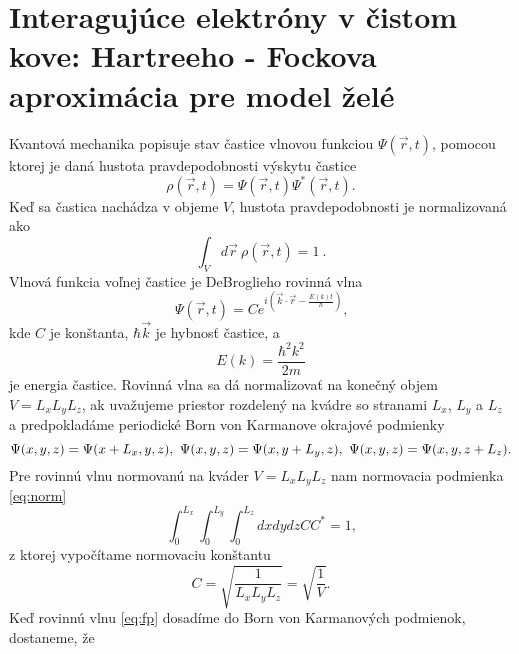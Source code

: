 \section{Interagujúce elektróny v čistom kove: Hartreeho - Fockova aproximácia pre model želé}
\label{sec:free_electrons}

Kvantová mechanika popisuje stav častice vlnovou funkciou $\Psi(\vec r,t)$, pomocou ktorej
je daná hustota pravdepodobnosti výskytu častice
\begin{equation}
\label{eq:fp2}
 \rho(\vec r, t)=\Psi(\vec r, t)\Psi^\ast(\vec r, t)\text{.}
\end{equation}
Keď sa častica nachádza v objeme $V$, hustota pravdepodobnosti je normalizovaná ako
\begin{equation}
\label{eq:norm}
 \int_{V} d \vec r  \  \rho(\vec r,t) = 1 \ .
\end{equation}
Vlnová funkcia voľnej častice je DeBroglieho rovinná vlna
\begin{equation}
\label{eq:fp}
 \Psi(\vec r,t)=Ce^{i(\vec k\cdot\vec r-\frac{E(k)t}{\hbar})} \text{,}
\end{equation}
kde $C$ je konštanta, $\hbar \vec k$ je hybnosť častice, a
\begin{equation}
 \label{eq:fp_erg}
 E(k)=\frac{\hbar^2 k^2}{2 m} \text{}
\end{equation}
je energia častice. Rovinná vlna sa dá normalizovať na konečný objem $V = L_xL_yL_z$,
ak uvažujeme priestor rozdelený na kvádre so stranami $L_x$, $L_y$ a $L_z$ a predpokladáme
periodické Born von Karmanove okrajové podmienky
\begin{equation}
 \Psi(x,y,z)=\Psi(x+L_x,y,z)\\, \\\ \Psi(x,y,z)=\Psi(x,y+L_y,z)\\, \\\ \Psi(x,y,z)=\Psi(x,y,z+L_z) \text{.}
\end{equation}
Pre rovinnú vlnu normovanú na kváder $V = L_xL_yL_z$ nam normovacia podmienka \eqref{eq:norm}
\begin{equation}
\label{eq:norm_bvk}
 \int_{0}^{L_x}  \int_{0}^{L_y}  \int_{0}^{L_z} dx dy dz  CC^\ast = 1\text{,}
\end{equation}
z ktorej vypočítame normovaciu konštantu
\begin{equation}
 \label{eq:A}
 C=\sqrt{\frac{1}{L_xL_yL_z}} = \sqrt{\frac{1}{V}} \text{.}
\end{equation}
Keď rovinnú vlnu \eqref{eq:fp} dosadíme do Born von Karmanových podmienok, dostaneme, že
